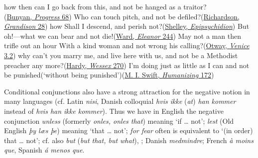  \z
\ex \label{ex:interrogative}
 \ea how then can I go back from this, and not be hanged as a traitor?\\\hfill(\href{https://archive.org/details/bunyanspilgrims00moffgoog/page/76/mode/2up?q=%22go+back+from+this%22&view=theater}{Bunyan, \textit{Progress} 68}) %
 \ex Who can touch pitch, and not be defiled?\hfill(\href{https://archive.org/details/bim_eighteenth-century_sir-charles-grandison-_richardson-samuel_1780_1/page/30/mode/2up?q=%22not+be+defiled%22&view=theater}{Richardson, \textit{Grandison} 28}) %
 \ex how Shall I descend, and perish not?\hfill(\href{https://archive.org/details/completepoeticalshel/page/408/mode/2up?view=theater&q=%22shall+I+descend%22}{Shelley, \textit{Epipsychidion}})
 \ex But oh!---what we can bear and not die!\hfill(\href{https://archive.org/details/cu31924013567130/page/304/mode/2up?q=%22and+not+die%22&view=theater}{Ward, \textit{Eleanor} 244})
 \z
\ex \label{ex:neg-interrogative} 
 \ea May not a man then trifle out an hour With a kind woman and not wrong his calling?\hfill(\href{https://archive.org/details/venicepreservdor00otwa/page/34/mode/2up?q=%22may+not+a+man+then%22&view=theater}{Otway, \textit{Venice} 3.2})
 \ex why can't you marry me, and live here with us, and not be a Methodist preacher any more?\hfill(\href{https://archive.org/details/dli.bengal.10689.8131/page/n275/mode/2up?q=%22Methodist+preacher+any+more%22&view=theater}{Hardy, \textit{Wessex} 270})
 \z
\ex \label{ex:unanalyzable} I'm doing just as little as I can and not be punished\newline (`without being punished')\hfill(\href{https://cdn.theatlantic.com/media/archives/1911/08/108-2/132299447.pdf}{M. I. Swift, \textit{Humanizing} 172})
\z{}

Conditional conjunctions also have a strong attraction for the negative notion in many languages (cf. Latin \textit{nisi}, Danish colloquial \textit{hvis ikke} (\textit{at}) \textit{han kommer} instead of \textit{hvis han ikke kommer}). Thus we have in English the negative conjunction \textit{unless} (formerly \textit{onles, onles that}) meaning `if {\dots} not'; \textit{lest} (Old English \textit{þy læs þe}) meaning `that {\dots} not'; \textit{for fear} often is equivalent to `(in order) that {\dots} not'; cf. also \textit{but} (\textit{but that, but what}), ; Danish \textit{medmindre}; French \textit{à moins que}, Spanish \textit{á menos que}.


